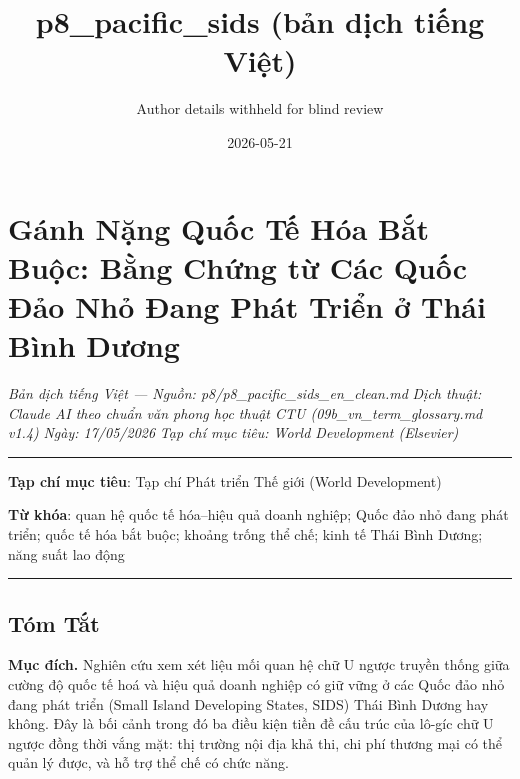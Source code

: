 \documentclass[12pt,a4paper]{article}
\title{p8\_pacific\_sids (bản dịch tiếng Việt)}
\author{Author details withheld for blind review}
\date{2026-05-21}
\begin{document}
\maketitle

\hypertarget{guxe1nh-nux1eb7ng-quux1ed1c-tux1ebf-huxf3a-bux1eaft-buux1ed9c-bux1eb1ng-chux1ee9ng-tux1eeb-cuxe1c-quux1ed1c-ux111ux1ea3o-nhux1ecf-ux111ang-phuxe1t-triux1ec3n-ux1edf-thuxe1i-buxecnh-dux1b0ux1a1ng}{%
\section{Gánh Nặng Quốc Tế Hóa Bắt Buộc: Bằng Chứng từ Các Quốc Đảo Nhỏ
Đang Phát Triển ở Thái Bình
Dương}\label{guxe1nh-nux1eb7ng-quux1ed1c-tux1ebf-huxf3a-bux1eaft-buux1ed9c-bux1eb1ng-chux1ee9ng-tux1eeb-cuxe1c-quux1ed1c-ux111ux1ea3o-nhux1ecf-ux111ang-phuxe1t-triux1ec3n-ux1edf-thuxe1i-buxecnh-dux1b0ux1a1ng}}

\emph{Bản dịch tiếng Việt --- Nguồn: p8/p8\_pacific\_sids\_en\_clean.md}
\emph{Dịch thuật: Claude AI theo chuẩn văn phong học thuật CTU
(09b\_vn\_term\_glossary.md v1.4)} \emph{Ngày: 17/05/2026} \emph{Tạp chí
mục tiêu: World Development (Elsevier)}

\begin{center}\rule{0.5\linewidth}{0.5pt}\end{center}

\textbf{Tạp chí mục tiêu}: Tạp chí Phát triển Thế giới (World
Development)

\textbf{Từ khóa}: quan hệ quốc tế hóa--hiệu quả doanh nghiệp; Quốc đảo
nhỏ đang phát triển; quốc tế hóa bắt buộc; khoảng trống thể chế; kinh tế
Thái Bình Dương; năng suất lao động

\begin{center}\rule{0.5\linewidth}{0.5pt}\end{center}

\hypertarget{tuxf3m-tux1eaft}{%
\subsection{Tóm Tắt}\label{tuxf3m-tux1eaft}}

\textbf{Mục đích.} Nghiên cứu xem xét liệu mối quan hệ chữ U ngược
truyền thống giữa cường độ quốc tế hoá và hiệu quả doanh nghiệp có giữ
vững ở các Quốc đảo nhỏ đang phát triển (Small Island Developing States,
SIDS) Thái Bình Dương hay không. Đây là bối cảnh trong đó ba điều kiện
tiền đề cấu trúc của lô-gíc chữ U ngược đồng thời vắng mặt: thị trường
nội địa khả thi, chi phí thương mại có thể quản lý được, và hỗ trợ thể
chế có chức năng.
\end{document}
